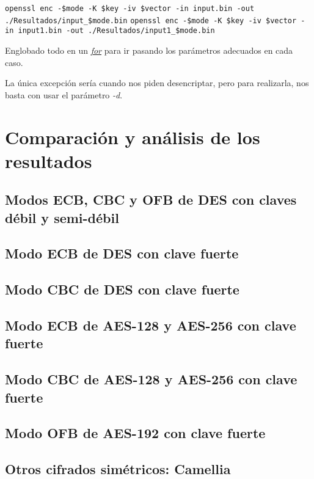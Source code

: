 \documentclass[a4paper, 11pt]{article}
\begin{document}
		\begin{small}
			\verb|openssl enc -$mode -K $key -iv $vector -in input.bin -out ./Resultados/input_$mode.bin|
			\verb|openssl enc -$mode -K $key -iv $vector -in input1.bin -out ./Resultados/input1_$mode.bin|
		\end{small}
		
		Englobado todo en un \href{http://manpages.ubuntu.com/manpages/zesty/en/man3/for.3tcl.html}{\textit{for}} para ir
		pasando los parámetros adecuados en cada caso.
		
		La única excepción sería cuando nos piden desencriptar, pero para realizarla, nos basta con usar el parámetro \textit{-d}.
	
\section{Comparación y análisis de los resultados}
	\subsection{Modos ECB, CBC y OFB de DES con claves débil y semi-débil}
	\subsection{Modo ECB de DES con clave fuerte}
	\subsection{Modo CBC de DES con clave fuerte}
	\subsection{Modo ECB de AES-128 y AES-256 con clave fuerte}
	\subsection{Modo CBC de AES-128 y AES-256 con clave fuerte}
	\subsection{Modo OFB de AES-192 con clave fuerte}
	\subsection{Otros cifrados simétricos: Camellia}
	
\end{document}

